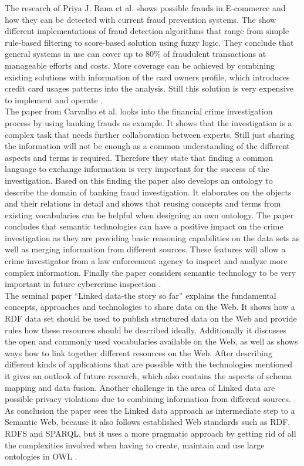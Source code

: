 The research of Priya J. Rana et al. shows possible frauds in \gls{E-commerce} and how they can be detected with current fraud prevention systems. The show different implementations of fraud detection algorithms that range from simple rule-based filtering to score-based solution using fuzzy logic. They conclude that general systems in use can cover up to 80\% of fraudulent transactions at manageable efforts and costs. More coverage can be achieved by combining existing solutions with information of the card owners profile, which introduces credit card usages patterns into the analysis. Still this solution is very expensive to implement and operate \citep{rana2015survey}. \\

The paper from Carvalho et al. looks into the financial crime investigation process by using banking frauds as example. It shows that the investigation is a complex task that needs further collaboration between experts. Still just sharing the information will not be enough as a common understanding of the different aspects and terms is required. Therefore they state that finding a common language to exchange information is very important for the success of the investigation. Based on this finding the paper also develops an ontology to describe the domain of banking fraud investigation. It elaborates on the objects and their relations in detail and shows that reusing concepts and terms from existing vocabularies can be helpful when designing an own ontology. The paper concludes that semantic technologies can have a positive impact on the crime investigation as they are providing basic reasoning capabilities on the data sets as well as merging information from different sources. These features will allow a crime investigator from a law enforcement agency to inspect and analyze more complex information. Finally the paper considers semantic technology to be very important in future cybercrime inspection \citep{carvalhoapplying}. \\

The seminal paper ``Linked data-the story so far'' explains the fundamental concepts, approaches and technologies to share data on the Web. It shows how a \gls{RDF} data set should be used to publish structured data on the Web and provide rules how these resources should be described ideally. Additionally it discusses the open and commonly used vocabularies available on the Web, as well as shows ways how to link together different resources on the Web. After describing different kinds of applications that are possible with the technologies mentioned it gives an outlook of future research, which also contains the aspects of schema mapping and data fusion. Another challenge in the area of Linked data are possible privacy violations due to combining information from different sources. As conclusion the paper sees the Linked data approach as intermediate step to a Semantic Web, because it also follows established Web standards such as \gls{RDF}, \gls{RDFS} and \gls{SPARQL}, but it uses a more pragmatic approach by getting rid of all the complexities involved when having to create, maintain and use large ontologies in \gls{OWL} \citep{bizer2009linked}. \\

